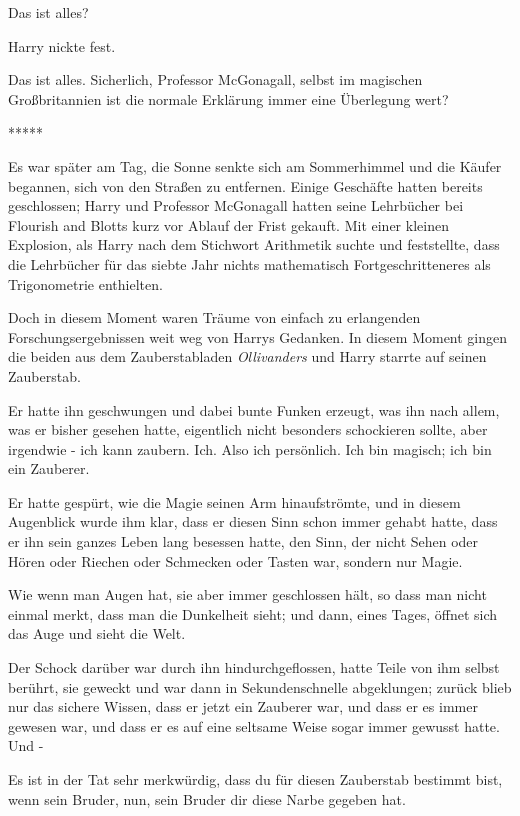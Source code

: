 \glqq{}Das ist alles?\grqq{}

Harry nickte fest.

\glqq{}Das ist alles. Sicherlich, Professor McGonagall, selbst im magischen
Großbritannien ist die normale Erklärung immer eine Überlegung wert?\grqq{}

\begin{center}*****\end{center}

Es war später am Tag, die Sonne senkte sich am Sommerhimmel und die Käufer
begannen, sich von den Straßen zu entfernen. Einige Geschäfte hatten bereits
geschlossen; Harry und Professor McGonagall hatten seine Lehrbücher bei Flourish
and Blotts kurz vor Ablauf der Frist gekauft. Mit einer kleinen Explosion, als
Harry nach dem Stichwort \glqq{}Arithmetik\grqq{} suchte und feststellte, dass
die Lehrbücher für das siebte Jahr nichts mathematisch Fortgeschritteneres als
Trigonometrie enthielten.

Doch in diesem Moment waren Träume von einfach zu erlangenden
Forschungsergebnissen weit weg von Harrys Gedanken. In diesem Moment gingen die
beiden aus dem Zauberstabladen \emph{Ollivanders} und Harry starrte auf seinen
Zauberstab.

Er hatte ihn geschwungen und dabei bunte Funken erzeugt, was ihn nach allem, was
er bisher gesehen hatte, eigentlich nicht besonders schockieren sollte, aber
irgendwie - ich kann zaubern. Ich. Also ich persönlich. Ich bin magisch; ich bin
ein Zauberer.

Er hatte gespürt, wie die Magie seinen Arm hinaufströmte, und in diesem
Augenblick wurde ihm klar, dass er diesen Sinn schon immer gehabt hatte, dass er
ihn sein ganzes Leben lang besessen hatte, den Sinn, der nicht Sehen oder Hören
oder Riechen oder Schmecken oder Tasten war, sondern nur Magie.

Wie wenn man Augen hat, sie aber immer geschlossen hält, so dass man nicht
einmal merkt, dass man die Dunkelheit sieht; und dann, eines Tages, öffnet sich
das Auge und sieht die Welt.

Der Schock darüber war durch ihn hindurchgeflossen, hatte Teile von ihm selbst
berührt, sie geweckt und war dann in Sekundenschnelle abgeklungen; zurück blieb
nur das sichere Wissen, dass er jetzt ein Zauberer war, und dass er es immer
gewesen war, und dass er es auf eine seltsame Weise sogar immer gewusst hatte.
Und -

\glqq{}Es ist in der Tat sehr merkwürdig, dass du für diesen Zauberstab bestimmt
bist, wenn sein Bruder, nun, sein Bruder dir diese Narbe gegeben hat.\grqq{}

